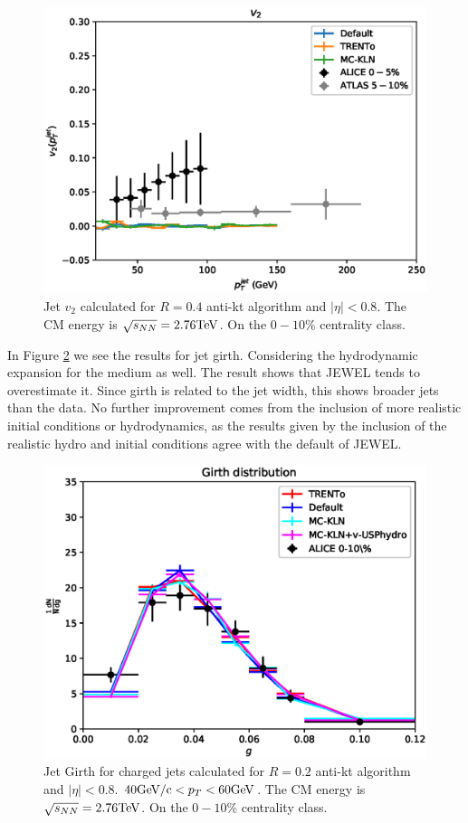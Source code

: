 \begin{figure}
\includegraphics[width=1.0\textwidth]{images/v2_4.eps}
\caption[Jet $v_2$ with realistic IC]{Jet $v_2$ calculated for $R=0.4$ anti-kt algorithm and $|\eta|<0.8$. The CM energy is $\sqrt{s_{NN}}= 2.76 {\rm TeV}$. On the $0-10\%$ centrality class.}
\label{jet_v2_ic}
\end{figure}

 \label{jewel_with_hydro}

In Figure \ref{jet_girth} we see the results for jet girth. Considering the hydrodynamic expansion for the medium as well. The result shows that JEWEL tends to overestimate it. Since girth is related to the jet width, this shows broader jets than the data. No further improvement comes from the inclusion of more realistic initial conditions or hydrodynamics, as the results given by the inclusion of the realistic hydro and initial conditions agree with the default of JEWEL.

\begin{figure}
\includegraphics[width=1.0\textwidth]{images/My_Angularity_4.eps}
\caption[Jet Girth]{Jet Girth for charged jets calculated for $R=0.2$ anti-kt algorithm and $|\eta|<0.8$. $40 {\rm GeV/c} < p_T < 60 {\rm GeV}$. The CM energy is $\sqrt{s_{NN}}= 2.76 {\rm TeV}$. On the $0-10\%$ centrality class.}
\label{jet_girth}
\end{figure}

